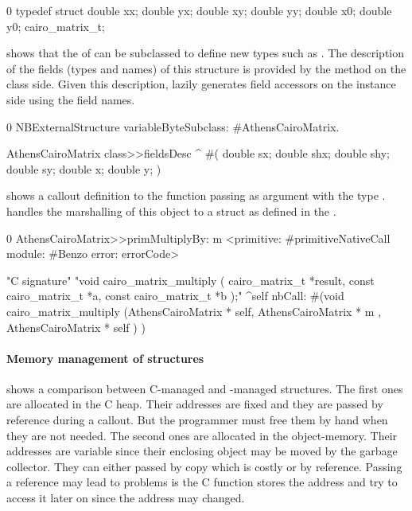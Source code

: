 \begin{numstcode}[
	label={lst:ffi-cairo_c_definition},
	caption={Example external type to convert back and forth with the Cairo library}]{0}
typedef struct {
    double xx; double yx;
    double xy; double yy;
    double x0; double y0;
} cairo_matrix_t;
\end{numstcode}

\noindent {} shows that the  of \NBFFI can be subclassed to define new types such as .
The description of the fields (types and names) of this structure is provided by the  method on the class side.
Given this description, \NB lazily generates field accessors on the instance side using the field names.

\begin{numstcode}[
	label={lst:ffi-AthensCairoMatrix},
	caption={Example of \NBFFI definition of an \ttt{ExternalStructure}}]{0}
NBExternalStructure
    variableByteSubclass: #AthensCairoMatrix.

AthensCairoMatrix class>>fieldsDesc
	^ #(  double sx; double shx;
		  double shy; double sy;
		  double x; double y;  )
\end{numstcode}

\noindent {} shows a callout definition to the
  function passing  as argument with the type .
\NB handles the marshalling of this object to a struct as defined in the .

\begin{numstcode}[
	label={lst:ffi-cairoCallouts},
	caption={Example of callouts using \ttt{cairo\_matrix\_t}}]{0}
AthensCairoMatrix>>primMultiplyBy: m
	<primitive: #primitiveNativeCall
	 module: #Benzo
     error: errorCode>

"C signature"
"void cairo_matrix_multiply (
                     cairo_matrix_t *result,
                     const cairo_matrix_t *a,
                     const cairo_matrix_t *b );"
	^self nbCall: #(void   cairo_matrix_multiply
		(AthensCairoMatrix * self,
		AthensCairoMatrix * m ,
		AthensCairoMatrix * self ) )
\end{numstcode}


\paragraph{Memory management of structures}
 shows a comparison between C-managed and \PH-managed structures.
The first ones are allocated in the C heap.
Their addresses are fixed and they are passed by reference during a callout.
But the programmer must free them by hand when they are not needed.
The second ones are allocated in the \PH object-memory.
Their addresses are variable since their enclosing object may be moved by the garbage collector.
They can either passed by copy which is costly or by reference.
Passing a reference may lead to problems is the C function stores the address and try to access it later on since the address may changed.


